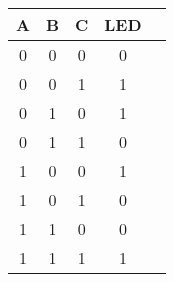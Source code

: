 \begin{table}[H]
\centering
\begin{tabular}{|c|c|c|c|c|}
\hline
 A  &  B  &  C  & LED \\
 \hline\hline
 0  &  0  &  0  &  0  \\
 \hline
 0  &  0  &  1  &  1  \\
 \hline
 0  &  1  &  0  &  1  \\
 \hline
 0  &  1  &  1  &  0  \\
 \hline
 1  &  0  &  0  &  1  \\
 \hline
 1  &  0  &  1  &  0  \\
 \hline
 1  &  1  &  0  &  0  \\
 \hline
 1  &  1  &  1  &  1  \\
 \hline
\end{tabular}
\par
\end{table}
